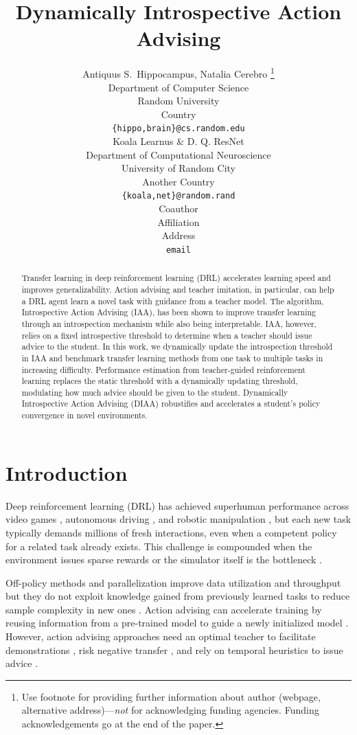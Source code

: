 \documentclass{article} %
\title{Dynamically Introspective Action Advising}
\author{Antiquus S.~Hippocampus, Natalia Cerebro  \thanks{ Use footnote for providing further information
about author (webpage, alternative address)---\emph{not} for acknowledging
funding agencies.  Funding acknowledgements go at the end of the paper.} \\
Department of Computer Science\\
Random University\\
Country \\
\texttt{\{hippo,brain\}@cs.random.edu} \\
\And %
Koala Learnus \& D. Q. ResNet  \\
Department of Computational Neuroscience \\
University of Random City \\
Another Country \\
\texttt{\{koala,net\}@random.rand} \\
\AND %
Coauthor \\
Affiliation \\
Address \\
\texttt{email}
}
\begin{document}
\maketitle

\begin{abstract}
Transfer learning in deep reinforcement learning (DRL) accelerates learning speed and improves generalizability. Action advising and teacher imitation, in particular, can help a DRL agent learn a novel task with guidance from a teacher model. The algorithm, Introspective Action Advising (IAA), has been shown to improve transfer learning through an introspection mechanism while also being interpretable. IAA, however, relies on a fixed introspective threshold to determine when a teacher should issue advice to the student. In this work, we dynamically update the introspection threshold in IAA and benchmark transfer learning methods from one task to multiple tasks in increasing difficulty. Performance estimation from teacher-guided reinforcement learning replaces the static  threshold with a dynamically updating threshold, modulating how much advice should be given to the student. Dynamically Introspective Action Advising (DIAA) robustifies and accelerates a student's policy convergence in novel environments.
\end{abstract}

\section{Introduction}
\label{sec:intro}

Deep reinforcement learning (DRL) has achieved superhuman performance across video games \citep{mnih2015human}, autonomous driving \citep{kazemkhani_gpudrive_2024}, and robotic manipulation \citep{yu2020meta}, but each new task typically demands millions of fresh interactions, even when a competent policy for a related task already exists. This challenge is compounded when the environment issues sparse rewards or the simulator itself is the bottleneck \citep{kiran2021deep}. 

Off-policy methods and parallelization improve data utilization and throughput but they do not exploit knowledge gained from previously learned tasks to reduce sample complexity in new ones \citep{haarnoja_soft_2018, fujimoto2018addressing, Lillicrap2015ContinuousCW, pmlr-v48-mniha16, schulman2017proximal}. Action advising can accelerate training by reusing information from a pre-trained model to guide a newly initialized model \citep{da2020agents, ye2020towards}. However, action advising approaches need an optimal teacher to facilitate demonstrations \cite{da2020agents}, risk negative transfer \cite{ahn2025prevalence}, and rely on temporal heuristics to issue advice \cite{khetarpal2022towards, campbell2023introspective}.
\end{document}
